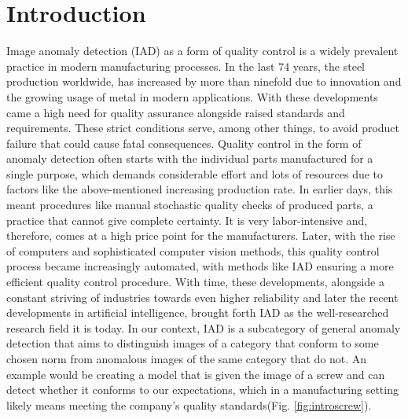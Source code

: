 \chapter{Introduction}
\label{chap:introduction}

Image anomaly detection (IAD) as a form of quality control is a widely prevalent practice in modern manufacturing processes. In the last 74 years, the steel production worldwide, 
has increased by more than ninefold \cite{worldsteel} due to innovation and the growing usage of metal in modern applications. 
With these developments came a high need for quality 
assurance alongside raised standards and requirements. These strict conditions serve, among other things, to avoid product failure that could cause fatal consequences. Quality control in the form of anomaly detection often 
starts with the individual parts manufactured for a single purpose, which demands considerable effort and lots of resources due to factors like 
the above-mentioned increasing production rate. 
In earlier days, this meant procedures like manual stochastic quality checks of produced parts, a practice that cannot give 
complete certainty. It is very labor-intensive and, therefore, comes at a high price point for the manufacturers. Later, with the rise of computers and sophisticated computer vision methods, 
this quality control process became increasingly automated, with methods like IAD ensuring a more efficient quality control procedure. With time, these developments, 
alongside a constant striving of industries towards even higher reliability and later the recent developments in artificial intelligence, brought forth IAD as the 
well-researched research field it is today.\newline 
In our context, IAD is a subcategory of general anomaly detection 
that aims to distinguish images of a category that conform to some chosen norm from anomalous images of the same category that do not. 
An example would be creating a model that is given the image of a screw and can detect whether it conforms to our expectations, 
which in a manufacturing setting likely means meeting the company's quality standards(Fig. \ref{fig:introscrew}).



